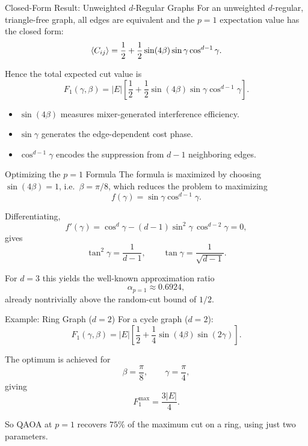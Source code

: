 \documentclass[aspectratio=169]{beamer}
\begin{document}
\begin{frame}{Closed-Form Result: Unweighted \(d\)-Regular Graphs}
For an unweighted \(d\)-regular, triangle-free graph, all edges are equivalent
and the \(p=1\) expectation value has the closed form:
\[
\ev{C_{ij}}
=
\frac{1}{2}
+
\frac{1}{2}\sin(4\beta)\sin\gamma \cos^{d-1}\gamma.
\]

Hence the total expected cut value is
\[
\boxed{
F_1(\gamma,\beta)
=
|E|
\left[
\frac{1}{2}
+
\frac{1}{2}\sin(4\beta)\sin\gamma \cos^{d-1}\gamma
\right].
}
\]

\begin{itemize}
    \item \(\sin(4\beta)\) measures mixer-generated interference efficiency.
    \item \(\sin\gamma\) generates the edge-dependent cost phase.
    \item \(\cos^{d-1}\gamma\) encodes the suppression from \(d-1\) neighboring edges.
\end{itemize}
\end{frame}

\begin{frame}{Optimizing the \(p=1\) Formula}
The formula is maximized by choosing \(\sin(4\beta)=1\), i.e.\ \(\beta=\pi/8\),
which reduces the problem to maximizing
\[
f(\gamma)=\sin\gamma \cos^{d-1}\gamma.
\]

Differentiating,
\[
f'(\gamma)=\cos^d\gamma - (d-1)\sin^2\gamma\,\cos^{d-2}\gamma = 0,
\]
gives
\[
\tan^2\gamma = \frac{1}{d-1},
\qquad
\tan\gamma = \frac{1}{\sqrt{d-1}}.
\]

For \(d=3\) this yields the well-known approximation ratio
\[
\alpha_{p=1} \approx 0.6924,
\]
already nontrivially above the random-cut bound of \(1/2\).
\end{frame}

\begin{frame}{Example: Ring Graph (\(d=2\))}
For a cycle graph (\(d=2\)):
\[
F_1(\gamma,\beta)
=
|E|
\left[
\frac{1}{2}
+
\frac{1}{4}\sin(4\beta)\sin(2\gamma)
\right].
\]

The optimum is achieved for
\[
\beta=\frac{\pi}{8},
\qquad
\gamma=\frac{\pi}{4},
\]
giving
\[
F_1^{\max} = \frac{3|E|}{4}.
\]

So QAOA at \(p=1\) recovers \(75\%\) of the maximum cut on a ring,
using just two parameters.
\end{frame}
\end{document}
